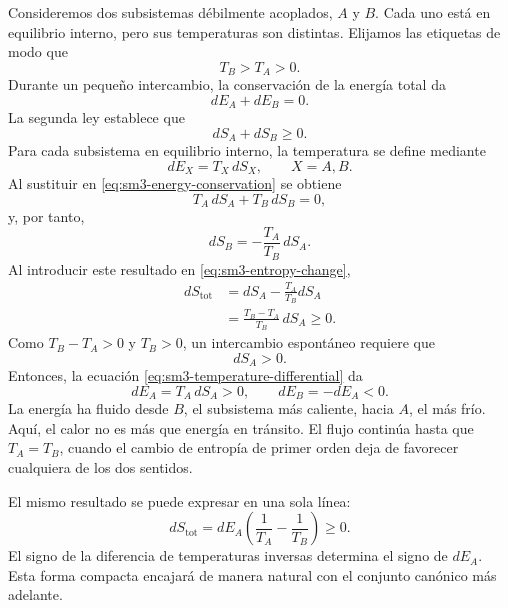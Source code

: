 Consideremos dos subsistemas débilmente acoplados, \(A\) y \(B\). Cada uno está en equilibrio interno, pero sus temperaturas son distintas. Elijamos las etiquetas de modo que
\begin{equation}
 T_B>T_A>0.
 \label{eq:sm3-temperature-order}
\end{equation}
Durante un pequeño intercambio, la conservación de la energía total da
\begin{equation}
 dE_A+dE_B=0.
 \label{eq:sm3-energy-conservation}
\end{equation}
La segunda ley establece que
\begin{equation}
 dS_A+dS_B\geq0.
 \label{eq:sm3-entropy-change}
\end{equation}
Para cada subsistema en equilibrio interno, la temperatura se define mediante
\begin{equation}
 dE_X=T_X\,dS_X,
 \qquad X=A,B.
 \label{eq:sm3-temperature-differential}
\end{equation}
Al sustituir en \eqref{eq:sm3-energy-conservation} se obtiene
\begin{equation}
 T_A\,dS_A+T_B\,dS_B=0,
\end{equation}
y, por tanto,
\begin{equation}
 dS_B=-\frac{T_A}{T_B}\,dS_A.
 \label{eq:sm3-dsb}
\end{equation}
Al introducir este resultado en \eqref{eq:sm3-entropy-change},
\begin{align}
 dS_{\mathrm{tot}}
 &=dS_A-\frac{T_A}{T_B}dS_A\\
 &=\frac{T_B-T_A}{T_B}\,dS_A\geq0.
 \label{eq:sm3-flow-entropy}
\end{align}
Como \(T_B-T_A>0\) y \(T_B>0\), un intercambio espontáneo requiere que
\[
 dS_A>0.
\]
Entonces, la ecuación \eqref{eq:sm3-temperature-differential} da
\begin{equation}
 dE_A=T_A\,dS_A>0,
 \qquad
 dE_B=-dE_A<0.
 \label{eq:sm3-hot-to-cold}
\end{equation}
La energía ha fluido desde \(B\), el subsistema más caliente, hacia \(A\), el más frío. Aquí, el calor no es más que energía en tránsito. El flujo continúa hasta que \(T_A=T_B\), cuando el cambio de entropía de primer orden deja de favorecer cualquiera de los dos sentidos.

El mismo resultado se puede expresar en una sola línea:
\begin{equation}
 dS_{\mathrm{tot}}
 =dE_A\left(\frac{1}{T_A}-\frac{1}{T_B}\right)\geq0.
 \label{eq:sm3-compact-flow}
\end{equation}
El signo de la diferencia de temperaturas inversas determina el signo de \(dE_A\). Esta forma compacta encajará de manera natural con el conjunto canónico más adelante.

